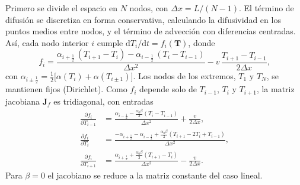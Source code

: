 \documentclass[final,5p,times,twocolumn,authoryear,11pt]{elsarticle}
\begin{document}
Primero se divide el espacio en $N$ nodos, con $\Delta x = L/(N-1)$. El término de difusión se discretiza en forma conservativa, calculando la difusividad en los puntos medios entre nodos, y el término de advección con diferencias centradas. Así, cada nodo interior $i$ cumple $\mathrm{d}T_i/\mathrm{d}t = f_i(\mathbf{T})$, donde
\begin{equation}
f_i = \frac{\alpha_{i+\frac12}\,(T_{i+1}-T_i) - \alpha_{i-\frac12}\,(T_i-T_{i-1})}{\Delta x^2}
- v\,\frac{T_{i+1}-T_{i-1}}{2\Delta x},
\label{eq:f_semidiscreta}
\end{equation}
\noindent con $\alpha_{i\pm\frac12}=\tfrac12\bigl[\alpha(T_i)+\alpha(T_{i\pm1})\bigr]$. Los nodos de los extremos, $T_1$ y $T_N$, se mantienen fijos (Dirichlet). Como $f_i$ depende solo de $T_{i-1}$, $T_i$ y $T_{i+1}$, la matriz jacobiana $\mathbf{J}_f$ es tridiagonal, con entradas
\begin{align}
\frac{\partial f_i}{\partial T_{i-1}} &= \frac{\alpha_{i-\frac12} - \tfrac{\alpha_0\beta}{2}(T_i-T_{i-1})}{\Delta x^2} + \frac{v}{2\Delta x},\nonumber\\
\frac{\partial f_i}{\partial T_{i}} &= \frac{-\alpha_{i+\frac12}-\alpha_{i-\frac12} + \tfrac{\alpha_0\beta}{2}(T_{i+1}-2T_i+T_{i-1})}{\Delta x^2},\nonumber\\
\frac{\partial f_i}{\partial T_{i+1}} &= \frac{\alpha_{i+\frac12} + \tfrac{\alpha_0\beta}{2}(T_{i+1}-T_i)}{\Delta x^2} - \frac{v}{2\Delta x}.
\label{eq:jacobiano}
\end{align}
\noindent Para $\beta=0$ el jacobiano se reduce a la matriz constante del caso lineal.
\end{document}

